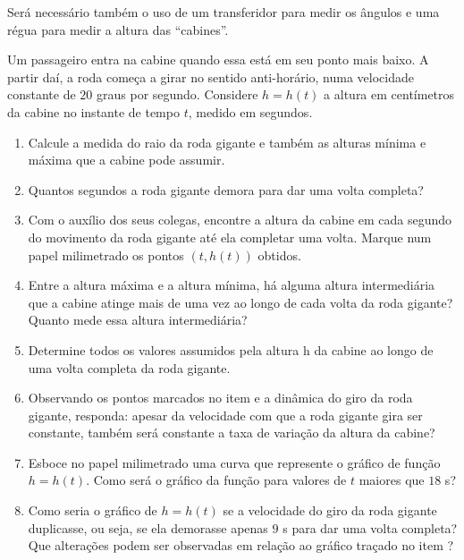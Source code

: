 \documentclass[10 pt,usenames,dvipsnames, oneside]{article}
\begin{document}
Será necessário também o uso de um transferidor para medir os ângulos e uma régua para medir a altura das “cabines”.

Um passageiro entra na cabine quando essa está em seu ponto mais baixo. A partir daí, a roda começa a girar no sentido anti-horário, numa velocidade constante de $20$ graus por segundo. Considere $h = h(t)$ a altura em centímetros da cabine no instante de tempo $t$, medido em segundos.
\begin{enumerate}
\item Calcule a medida do raio da roda gigante e também as alturas mínima e máxima que a cabine pode assumir.
\item Quantos segundos a roda gigante demora para dar uma volta completa?
\item Com o auxílio dos seus colegas, encontre a altura da cabine em cada segundo do movimento da roda gigante até ela completar uma volta. Marque num papel milimetrado os pontos $(t,h(t))$ obtidos.
\item Entre a altura máxima e a altura mínima, há alguma altura intermediária que a cabine atinge mais de uma vez ao longo de cada volta da roda gigante? Quanto mede essa altura intermediária?
\item Determine todos os valores assumidos pela altura h da cabine ao longo de uma volta completa da roda gigante.
\item Observando os pontos marcados no item  e a dinâmica do giro da roda gigante, responda: apesar da velocidade com que a roda gigante gira ser constante, também será constante a taxa de variação da altura da cabine?  
\item Esboce no papel milimetrado uma curva que represente o gráfico de função $h = h(t)$. Como será o gráfico da função para valores de $t$ maiores que $18$ s?
\item Como seria o gráfico de $h = h(t)$ se a velocidade do giro da roda gigante duplicasse, ou seja, se ela demorasse apenas $9$ s para dar uma volta completa? Que alterações podem ser observadas em relação ao gráfico traçado no item ?
\end{enumerate}
\end{document}
